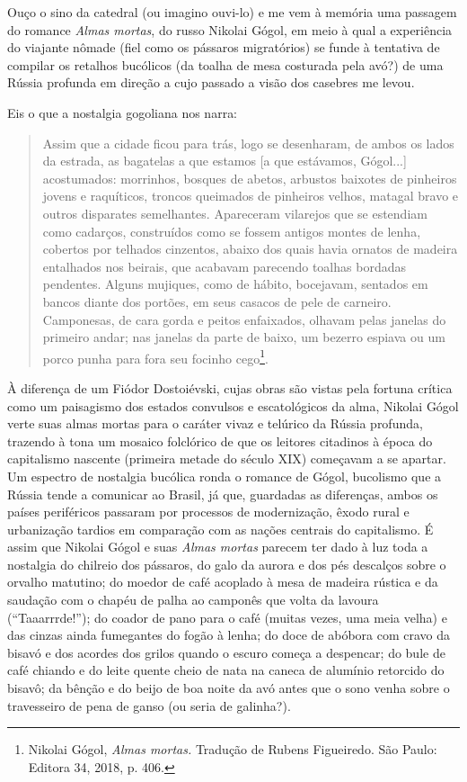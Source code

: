 Ouço o sino da catedral (ou imagino ouvi-lo) e me vem à memória uma
passagem do romance \emph{Almas mortas}, do russo Nikolai Gógol, em meio
à qual a experiência do viajante nômade (fiel como os pássaros
migratórios) se funde à tentativa de compilar os retalhos bucólicos (da
toalha de mesa costurada pela avó?) de uma Rússia profunda em direção a
cujo passado a visão dos casebres me levou.

Eis o que a nostalgia gogoliana nos narra:

\begin{quote}
Assim que a cidade ficou para trás, logo se desenharam, de ambos os
lados da estrada, as bagatelas a que estamos {[}a que estávamos,
Gógol...{]} acostumados: morrinhos, bosques de abetos, arbustos baixotes
de pinheiros jovens e raquíticos, troncos queimados de pinheiros velhos,
matagal bravo e outros disparates semelhantes. Apareceram vilarejos que
se estendiam como cadarços, construídos como se fossem antigos montes de
lenha, cobertos por telhados cinzentos, abaixo dos quais havia ornatos
de madeira entalhados nos beirais, que acabavam parecendo toalhas
bordadas pendentes. Alguns mujiques, como de hábito, bocejavam, sentados
em bancos diante dos portões, em seus casacos de pele de carneiro.
Camponesas, de cara gorda e peitos enfaixados, olhavam pelas janelas do
primeiro andar; nas janelas da parte de baixo, um bezerro espiava ou um
porco punha para fora seu focinho cego\footnote{Nikolai Gógol,
  \emph{Almas mortas.} Tradução de Rubens Figueiredo. São Paulo: Editora
  34, 2018, p. 406.}.
\end{quote}

À diferença de um Fiódor Dostoiévski, cujas obras são vistas pela
fortuna crítica como um paisagismo dos estados convulsos e escatológicos
da alma, Nikolai Gógol verte suas almas mortas para o caráter vivaz e
telúrico da Rússia profunda, trazendo à tona um mosaico folclórico de
que os leitores citadinos à época do capitalismo nascente (primeira
metade do século XIX) começavam a se apartar. Um espectro de nostalgia
bucólica ronda o romance de Gógol, bucolismo que a Rússia tende a
comunicar ao Brasil, já que, guardadas as diferenças, ambos os países
periféricos passaram por processos de modernização, êxodo rural e
urbanização tardios em comparação com as nações centrais do capitalismo.
É assim que Nikolai Gógol e suas \emph{Almas mortas} parecem ter dado à
luz toda a nostalgia do chilreio dos pássaros, do galo da aurora e dos
pés descalços sobre o orvalho matutino; do moedor de café acoplado à
mesa de madeira rústica e da saudação com o chapéu de palha ao camponês
que volta da lavoura (``Taaarrrde!''); do coador de pano para o café
(muitas vezes, uma meia velha) e das cinzas ainda fumegantes do fogão à
lenha; do doce de abóbora com cravo da bisavó e dos acordes dos grilos
quando o escuro começa a despencar; do bule de café chiando e do leite
quente cheio de nata na caneca de alumínio retorcido do bisavô; da
bênção e do beijo de boa noite da avó antes que o sono venha sobre o
travesseiro de pena de ganso (ou seria de galinha?).

